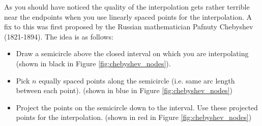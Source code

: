 As you should have noticed the quality of the interpolation gets rather terrible near the
endpoints when you use linearly spaced points for the interpolation.  A fix to this was
first proposed by the Russian mathematician Pafnuty Chebyshev (1821-1894).  The idea is as
follows:
\begin{itemize}
    \item Draw a semicircle above the closed interval on which you are interpolating
        (shown in black in Figure \ref{fig:chebyshev_nodes}).
    \item Pick $n$ equally spaced points along the semicircle (i.e. same arc length between
        each point).  (shown in blue in Figure \ref{fig:chebyshev_nodes})
    \item Project the points on the semicircle down to the interval.  Use these projected
        points for the interpolation. (shown in red in Figure \ref{fig:chebyshev_nodes})
\end{itemize}

